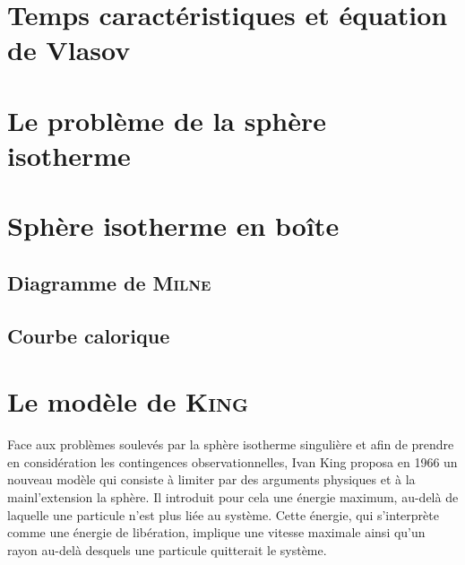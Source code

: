 \chapter{Temps caractéristiques et équation de Vlasov\label{Chap::TempsCarac}}
	\minitoc

	

	

\chapter{Le problème de la sphère isotherme}
		\minitoc
		
		

\chapter{Sphère isotherme en boîte\label{SIB::Chapitre}}
	\minitoc

	\section{Diagramme de \textsc{Milne}}
		

	\section{Courbe calorique}
		

%			

\chapter{Le modèle de \textsc{King}\label{King::Chapitre}}
	\minitoc

	Face aux problèmes soulevés par la sphère isotherme singulière et afin de prendre en considération les contingences observationnelles, Ivan
	King proposa en 1966 un nouveau modèle qui consiste à limiter par des arguments physiques et \og à la main\fg l'extension la sphère. Il
	introduit pour cela une énergie maximum, au-delà de laquelle une particule n'est plus liée au système. Cette énergie, qui s'interprète comme
	une énergie de libération, implique une vitesse maximale ainsi qu'un rayon au-delà desquels une particule quitterait le système.

